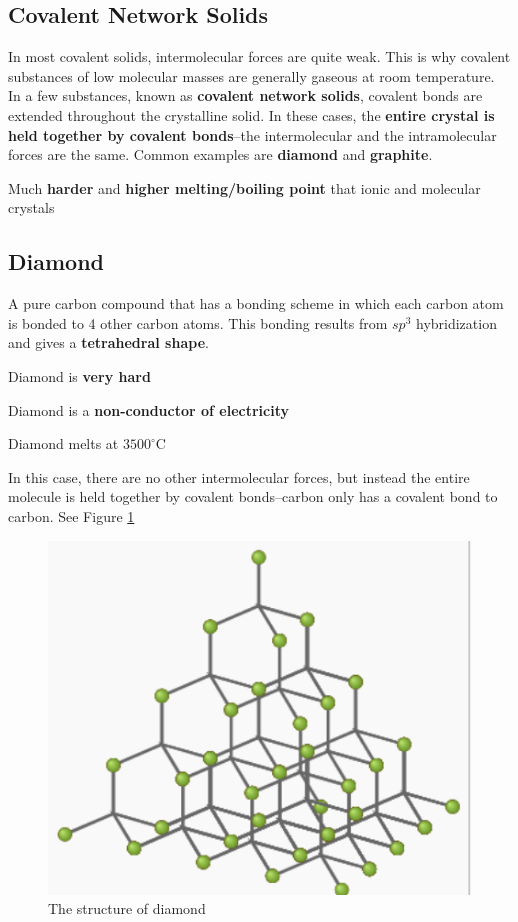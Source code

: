 \subsection{Covalent Network Solids}
In most covalent solids, intermolecular forces are quite weak. This is why covalent substances of
low molecular masses are generally gaseous at room temperature.\\

In a few substances, known as \textbf{covalent network solids}, covalent bonds are extended
throughout the crystalline solid. In these cases, the \textbf{entire crystal is held together
by covalent bonds}--the intermolecular and the intramolecular forces are the same. Common examples
are \textbf{diamond} and \textbf{graphite}.
\begin{bulleted-list}
    \item Much \textbf{harder} and \textbf{higher melting/boiling point} that ionic and molecular
        crystals
\end{bulleted-list}

\subsection{Diamond}
A pure carbon compound that has a bonding scheme in which each carbon atom is bonded to 4 other
carbon atoms. This bonding results from $sp^3$ hybridization and gives a \textbf{tetrahedral shape}.
\begin{bulleted-list}
    \item Diamond is \textbf{very hard}
    \item Diamond is a \textbf{non-conductor of electricity}
    \item Diamond melts at $3500^{\circ}\text{C}$
\end{bulleted-list}
In this case, there are no other intermolecular forces, but instead the entire molecule is held
together by covalent bonds--carbon only has a covalent bond to carbon. See Figure \ref{fig:diamond-structure}

\begin{figure}[ht!]
    \centering
    \includegraphics[width=0.3 \textwidth]{../figures/diamond-structure.png}
    \caption{The structure of diamond}
    \label{fig:diamond-structure}
\end{figure}

